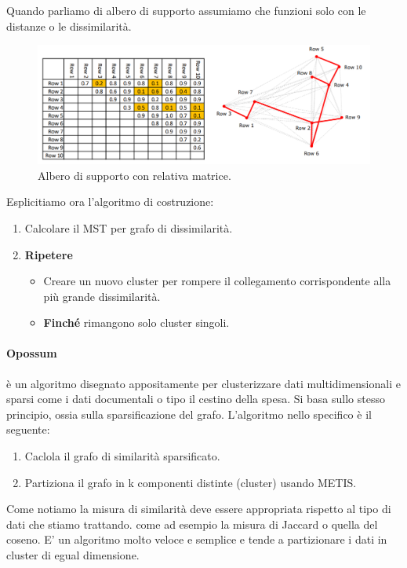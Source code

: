 Quando parliamo di albero di supporto assumiamo che funzioni solo con le distanze o le dissimilarità.
\begin{figure}[H]
	\centering
	\includegraphics[height=0.30 \linewidth]{clustering/pict/mst.png}
	\caption{Albero di supporto con relativa matrice.}
\end{figure}
Esplicitiamo ora l'algoritmo di costruzione:
\begin{enumerate}
	\item Calcolare il MST per grafo di dissimilarità.
	\item \textbf{Ripetere}
	\begin{itemize}
		\item Creare un nuovo cluster per rompere il collegamento corrispondente alla più grande dissimilarità.
		\item \textbf{Finché} rimangono solo cluster singoli.
	\end{itemize}
	
\end{enumerate}

\paragraph{Opossum} è un algoritmo disegnato appositamente per clusterizzare dati multidimensionali e sparsi come i dati documentali o tipo il cestino della spesa. Si basa sullo stesso principio, ossia sulla sparsificazione del grafo. L'algoritmo nello specifico è il seguente:
\begin{enumerate}
	\item Caclola il grafo di similarità  sparsificato.
	\item Partiziona il grafo in k componenti distinte (cluster) usando METIS.
\end{enumerate}
Come notiamo la misura di similarità deve essere appropriata rispetto al tipo di dati che stiamo trattando. come ad esempio la misura di Jaccard o quella del coseno. E' un algoritmo molto veloce e semplice e tende a partizionare i dati in cluster di egual dimensione.

